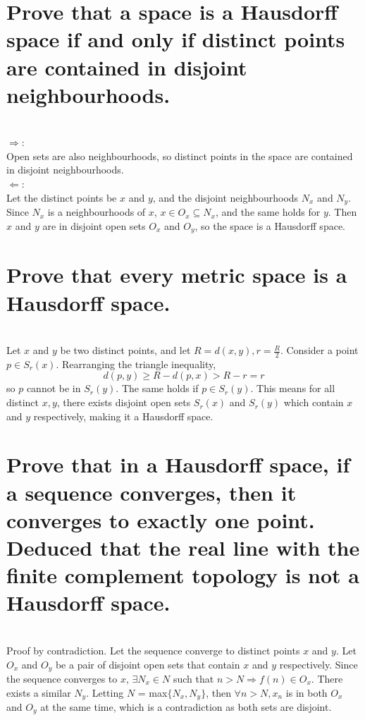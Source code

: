 \begin{parts}
 
 \part{Prove that a space is a Hausdorff space if and only if distinct points are contained in disjoint neighbourhoods.}
 
\begin{solution}
 \\$\Rightarrow$: \\
 Open sets are also neighbourhoods, so distinct points in the space are contained in disjoint neighbourhoods. \\
 $\Leftarrow$: \\
 Let the distinct points be $x$ and $y$, and the disjoint neighbourhoods $N_x$ and $N_y$. Since $N_x$ is a neighbourhoods of $x$, $x \in O_x \subseteq N_x$, and the same holds for $y$. Then $x$ and $y$ are in disjoint open sets $O_x$ and $O_y$, so the space is a Hausdorff space.
\end{solution}

\part{Prove that every metric space is a Hausdorff space.}

\begin{solution}
\\Let $x$ and $y$ be two distinct points, and let $R = d(x,y), r = \frac{R}{2}$. Consider a point $p \in S_r(x)$. Rearranging the triangle inequality,
$$d(p,y) \geq R - d(p,x) > R - r = r$$
so $p$ cannot be in $S_r(y)$. The same holds if $p \in S_r(y)$. This means for all distinct $x, y$, there exists disjoint open sets $S_r(x)$ and $S_r(y)$ which contain $x$ and $y$ respectively, making it a Hausdorff space.
\end{solution}

\part{Prove that in a Hausdorff space, if a sequence converges, then it converges to exactly one point. Deduced that the real line with the finite complement topology is not a Hausdorff space.}

\begin{solution}
 \\Proof by contradiction. Let the sequence converge to distinct points $x$ and $y$. Let $O_x$ and $O_y$ be a pair of disjoint open sets that contain $x$ and $y$ respectively. Since the sequence converges to $x$, $\exists N_x \in N$ such that $n > N \Rightarrow f(n) \in O_x$. There exists a similar $N_y$. Letting $N$ = max$\{N_x, N_y\}$, then $\forall n > N, x_n$ is in both $O_x$ and $O_y$ at the same time, which is a contradiction as both sets are disjoint.
\end{solution}

\end{parts}

